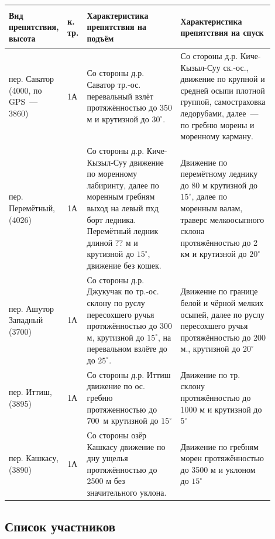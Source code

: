 \begin{table}[h!]
		\begin{tabular}{|>{\centering\arraybackslash}m{0.17\linewidth}|>{\centering\arraybackslash}m{0.03\linewidth}|>{\centering\arraybackslash}m{0.35\linewidth}|>{\centering\arraybackslash}m{0.35\linewidth}|}
			\hline
			\textbf{Вид препятствия, высота} &
			\begin{turn}{90}\textbf{к. тр.}\end{turn} &
			\textbf{Характеристика препятствия на подъём} &
			\textbf{Характеристика препятствия на спуск} \\
			\hline			
			пер. Саватор (4000, по GPS~--- 3860) & 1А &  Со стороны д.р. Саватор тр.-ос. перевальный взлёт протяжённостью до \alert{350} м и крутизной до $30^{\circ}$.  & Со стороны д.р. Киче-Кызыл-Суу ск.-ос., движение по крупной и средней осыпи плотной группой, самостраховка ледорубами, далее~--- по гребню морены и моренному карману.\\
			\hline			
			пер. Перемётный, (4026)  & 1А & Со стороны д.р. Киче-Кызыл-Суу движение по моренному лабиринту, далее по моренным гребням выход на левый пхд борт ледника. Перемётный ледник длиной \alert{??} м и крутизной  до $15^{\circ}$, движение без кошек. & Движение по перемётному леднику до 80 м  крутизной  до $15^{\circ}$, далее по моренным валам, траверс мелкоосыпного склона протяжённостью до 2 км и крутизной  до $20^{\circ}$ \\
			\hline
			пер. Ашутор Западный (3700)  & 1А & Со стороны д.р. Джукучак по тр.-ос. склону по руслу пересохшего ручья протяжённостью до \alert{300 м}, крутизной до $15^{\circ}$, на перевальном взлёте до до $25^{\circ}$. & Движение по границе белой и чёрной мелких осыпей, далее по руслу пересохшего ручья протяжённостью до \alert{200 м}., крутизной до $20^{\circ}$\\
			\hline
			пер. Иттиш, (3895)  & 1А & Со стороны д.р. Иттиш движение по ос. гребню протяженностью до 700~м крутизной  до $15^{\circ}$ & Движение по тр. склону протяжённостью до 1000 м и крутизной до $5^{\circ}$\\
			\hline
			пер. Кашкасу, (3890)  & 1А & Со стороны озёр Кашкасу движение по дну ущелья протяжённостью до 2500 м без значительного уклона. &  Движение по гребням морен протяжённостью до 3500 м и уклоном до $15^{\circ}$\\
			\hline
	\end{tabular}%
\end{table}

\clearpage
\subsection{Список участников} 

